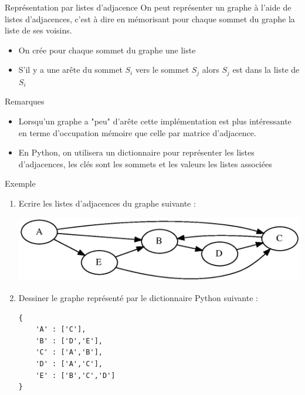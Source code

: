 \documentclass[10pt]{beamer}
\begin{document}
\begin{frame}
	\mframe{\GR}
	\begin{alertblock}{Représentation par listes d'adjacence}
		On peut représenter un graphe à l'aide de listes d'adjacences, c'est à dire en mémorisant pour chaque sommet du graphe la liste de ses voisins.
		\begin{itemize}
			\item<2-> On crée pour chaque sommet du graphe une liste
			\item<3-> S'il y a une arête du sommet $S_i$ vers le sommet $S_j$ alors  $S_j$ est dans la liste de $S_i$
		\end{itemize}
	\end{alertblock}
	\begin{block}{Remarques}
		\begin{itemize}
			\item<5-> Lorsqu'un graphe a "peu" d'arête cette implémentation est plus intéressante en terme d'occupation mémoire que celle par matrice d'adjacence.
			\item<6-> En Python, on utilisera un dictionnaire pour représenter les listes d'adjacences, les clés sont les sommets et les valeurs les listes associées
		\end{itemize}
	\end{block}
\end{frame}

\begin{frame}[fragile]
	\mframe{\GR}
	\begin{exampleblock}{Exemple}
		\begin{enumerate}
			\item<1-> Ecrire les listes d'adjacences du graphe suivante :
			      \begin{center}
				      \includegraphics[scale=0.5]{graph3.eps}
			      \end{center}
			\item<2-> Dessiner le graphe représenté par le dictionnaire Python suivante :
			      \begin{lstlisting}
{ 	
	'A' : ['C'],
 	'B' : ['D','E'],
 	'C' : ['A','B'],
 	'D' : ['A','C'],
 	'E' : ['B','C','D']
} 
\end{lstlisting}
		\end{enumerate}
	\end{exampleblock}
\end{frame}
\end{document}
